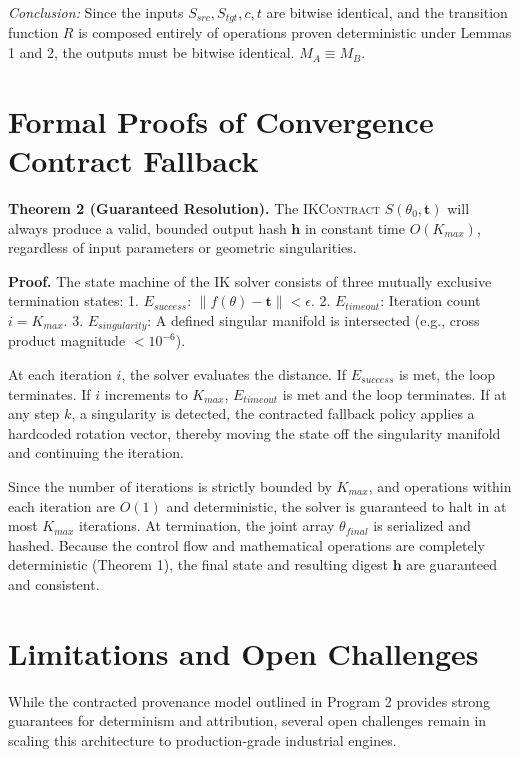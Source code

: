 \documentclass[sigconf,nonacm]{acmart}
\newcommand{\ikcontract}{\textsc{IKContract}}
\begin{document}
\textit{Conclusion:} Since the inputs $S_{src}, S_{tgt}, c, t$ are bitwise
identical, and the transition function $R$ is composed entirely of operations
proven deterministic under Lemmas 1 and 2, the outputs must be bitwise
identical. $M_A \equiv M_B$. \qedsymbol{}

\section{Formal Proofs of Convergence Contract Fallback}

\textbf{Theorem 2 (Guaranteed Resolution).} The \ikcontract{} $S(\theta_0,
\mathbf{t})$ will always produce a valid, bounded output hash $\mathbf{h}$ in
constant time $O(K_{max})$, regardless of input parameters or geometric
singularities.

\textbf{Proof.} The state machine of the IK solver consists of three mutually
exclusive termination states: 1. $E_{success}$: $\| f(\theta) - \mathbf{t} \| <
\epsilon$. 2. $E_{timeout}$: Iteration count $i = K_{max}$. 3.
$E_{singularity}$: A defined singular manifold is intersected (e.g., cross
product magnitude $< 10^{-6}$).

At each iteration $i$, the solver evaluates the distance. If $E_{success}$ is
met, the loop terminates. If $i$ increments to $K_{max}$, $E_{timeout}$ is met
and the loop terminates. If at any step $k$, a singularity is detected, the
contracted fallback policy applies a hardcoded rotation vector, thereby moving
the state off the singularity manifold and continuing the iteration.

Since the number of iterations is strictly bounded by $K_{max}$, and operations
within each iteration are $O(1)$ and deterministic, the solver is guaranteed to
halt in at most $K_{max}$ iterations. At termination, the joint array
$\theta_{final}$ is serialized and hashed. Because the control flow and
mathematical operations are completely deterministic (Theorem 1), the final
state and resulting digest $\mathbf{h}$ are guaranteed and consistent.
\qedsymbol{}


\section{Limitations and Open Challenges}

While the contracted provenance model outlined in Program 2 provides strong
guarantees for determinism and attribution, several open challenges remain in
scaling this architecture to production-grade industrial engines.
\end{document}
